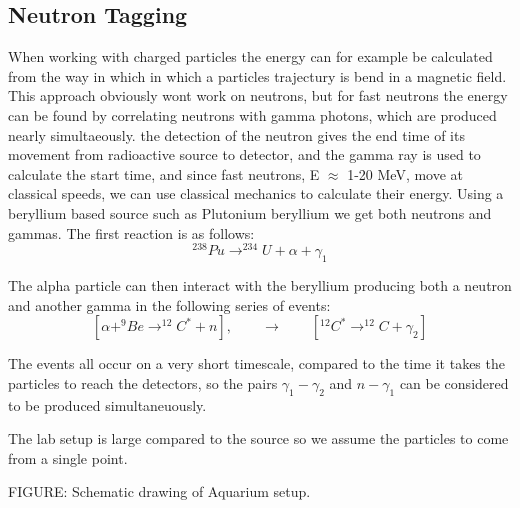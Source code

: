 \documentclass[main.tex]{subfiles}
\begin{document}
\subsection{Neutron Tagging}
When working with charged particles the energy can for example be calculated from the way in which in which a particles trajectury is bend in a magnetic field. This approach obviously wont work on neutrons, but for fast neutrons the energy can be found by correlating neutrons with gamma photons, which are produced nearly simultaeously. the detection of the neutron gives the end time of its movement from radioactive source to detector, and the gamma ray is used to calculate the start time, and since fast neutrons, E $\approx$ 1-20 MeV, move at classical speeds, we can use classical mechanics to calculate their energy. 
Using a beryllium based source such as Plutonium beryllium we get both neutrons and gammas. The first reaction is as follows: $$^{238}Pu\rightarrow^{234}U+\alpha+\gamma_1$$

The alpha particle can then interact with the beryllium producing both a neutron and another gamma in the following series of events: $$[\alpha+^{9}Be\rightarrow^{12}C^{*}+n],\qquad \longrightarrow \qquad [^{12}C^ {*}\rightarrow^{12}C+\gamma_2]$$

The events all occur on a very short timescale, compared to the time it takes the particles to reach the detectors, so the pairs $\gamma_1-\gamma_2$ and $n-\gamma_1$ can be considered to be produced simultaneuously. %

The lab setup is large compared to the source so we assume the particles to come from a single point.

FIGURE: Schematic drawing of Aquarium setup.
\end{document}
